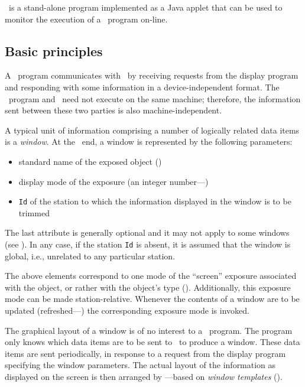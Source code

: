 \dsd\ is a stand-alone program implemented as a Java applet
that can be used to monitor the execution of a \smurph\ program on-line.

\subsection{Basic principles}
\label{rm_ds_bp}

A \smurph\ program
communicates with \dsd\ by receiving requests from the
display program
and responding with some information in a device-independent format.
The \smurph\ program and \dsd\ need not execute on the same machine;
therefore, the information sent between these two parties is also
machine-independent.

A typical unit of information comprising a number of logically related
data items is a {\em window}.
At the \smurph\ end, a window is represented by the following
parameters:

\begin{itemize}
\item
standard name of the exposed object ()
\item
display mode of the exposure (an integer number---)
\item
{\tt Id} of the station to which the information
displayed in the window is to be trimmed
\end{itemize}

The last attribute is generally optional and it may not apply to some windows
(see ).
In any case, if the station {\tt Id} is absent, it is assumed that the window
is global, i.e., unrelated to any particular station.

The above elements correspond to one mode of the ``screen'' exposure
associated with the object, or rather with the object's type ().
Additionally, this exposure mode can be made station-relative.
Whenever the contents of a window are to be updated
(refreshed---) the
corresponding exposure mode is invoked.

The graphical layout of a window is of no interest to a \smurph\ program.
The program only knows which data items are to be sent to \dsd\
to produce a window.
These data items are sent periodically,
in response to a request from the display program
specifying the window parameters.
The actual layout of the information as displayed on the screen
is then arranged by \dsd---based on {\em window templates\/} 
().

